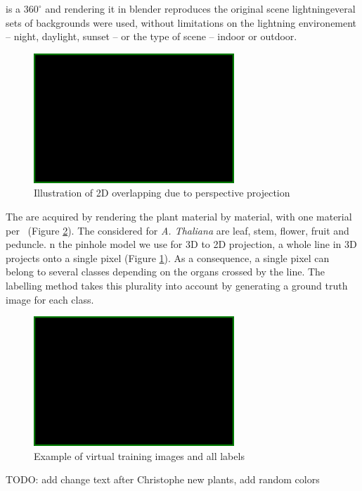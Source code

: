 
 is a $360^{\circ}$
 and rendering it in blender reproduces the
original scene lightningeveral sets of backgrounds were
used, without limitations on the lightning environement -- night, daylight,
sunset -- or the type of scene -- indoor or outdoor.


\begin{figure}[h]
    \centering \includegraphics[width=0.1\linewidth]{figures/blank.png}
    \caption{Illustration of 2D overlapping due to perspective
    projection } \label{fig:pinhole}
\end{figure}

The  are acquired by rendering the plant material by material, with one material per
~(Figure \ref{fig:plants}). The
 considered for \textit{A. Thaliana} are leaf, stem, flower,
fruit and peduncle. n the pinhole model \cite{} we use for 3D to 2D
projection, a whole line in 3D projects onto a single pixel (Figure
\ref{fig:pinhole}). As a consequence, a single pixel can belong to
several classes depending on the organs crossed by the line. The
labelling method takes this plurality into account by generating a
ground truth image for each class.

\begin{figure}[h]
    \centering \includegraphics[width=0.1\linewidth]{figures/blank.png}
    \caption{Example of virtual training images and all labels}
    \label{fig:plants}
\end{figure}

TODO: add change text after Christophe new plants, add random colors


